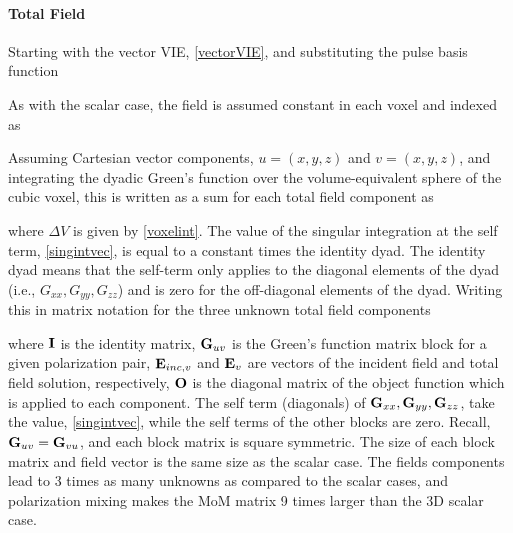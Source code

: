 \paragraph{Total Field}

Starting with the vector VIE, \eqref{vectorVIE}, and substituting the pulse basis function

As with the scalar case, the field is assumed constant in each voxel and indexed as

Assuming Cartesian vector components, $u = (x,y,z)$ and $v = (x,y,z)$, and integrating the dyadic Green's function over the volume-equivalent sphere of the cubic voxel, this is written as a sum for each total field component as

\noindent where $\Delta V$ is given by \eqref{voxelint}. The value of the singular integration at the self term, \eqref{singintvec}, is equal to a constant times the identity dyad. The identity dyad means that the self-term only applies to the diagonal elements of the dyad (i.e., $G_{xx}, G_{yy}, G_{zz}$) and is zero for the off-diagonal elements of the dyad. Writing this in matrix notation for the three unknown total field components 

\noindent where $\mathbf{I}$ is the identity matrix, $\mathbf{G}_{uv}$ is the Green's function matrix block for a given polarization pair, $\mathbf{E}_{inc,v}$ and $\mathbf{E}_{v}$ are vectors of the incident field and total field solution, respectively, $\mathbf{O}$ is the diagonal matrix of the object function which is applied to each component. The self term (diagonals) of $\mathbf{G}_{xx}, \mathbf{G}_{yy}, \mathbf{G}_{zz}$, take the value, \eqref{singintvec}, while the self terms of the other blocks are zero. Recall, $\mathbf{G}_{uv} = \mathbf{G}_{vu}$, and each block matrix is square symmetric. The size of each block matrix and field vector is the same size as the scalar case. The fields components lead to 3 times as many unknowns as compared to the scalar cases, and polarization mixing makes the MoM matrix 9 times larger than the 3D scalar case. 



